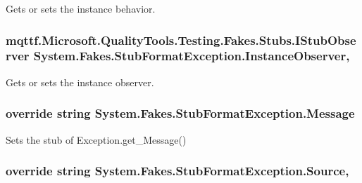 Gets or sets the instance behavior.

\hypertarget{class_system_1_1_fakes_1_1_stub_format_exception_a8e62230f292ee8b7ab79690fd7d97df9}{
\subsubsection[{Instance\-Observer}]{\setlength{\rightskip}{0pt plus 5cm}mqttf.\-Microsoft.\-Quality\-Tools.\-Testing.\-Fakes.\-Stubs.\-I\-Stub\-Observer System.\-Fakes.\-Stub\-Format\-Exception.\-Instance\-Observer\hspace{0.3cm}{\ttfamily [get]}, {\ttfamily [set]}}}\label{class_system_1_1_fakes_1_1_stub_format_exception_a8e62230f292ee8b7ab79690fd7d97df9}


Gets or sets the instance observer.

\hypertarget{class_system_1_1_fakes_1_1_stub_format_exception_a541ba775a60b8523447a9c4deaf8ebcb}{
\subsubsection[{Message}]{\setlength{\rightskip}{0pt plus 5cm}override string System.\-Fakes.\-Stub\-Format\-Exception.\-Message\hspace{0.3cm}{\ttfamily [get]}}}\label{class_system_1_1_fakes_1_1_stub_format_exception_a541ba775a60b8523447a9c4deaf8ebcb}


Sets the stub of Exception.\-get\-\_\-\-Message()

\hypertarget{class_system_1_1_fakes_1_1_stub_format_exception_a5ae12133fc73e1aa019722b40ed3a0c1}{
\subsubsection[{Source}]{\setlength{\rightskip}{0pt plus 5cm}override string System.\-Fakes.\-Stub\-Format\-Exception.\-Source\hspace{0.3cm}{\ttfamily [get]}, {\ttfamily [set]}}}\label{class_system_1_1_fakes_1_1_stub_format_exception_a5ae12133fc73e1aa019722b40ed3a0c1}


